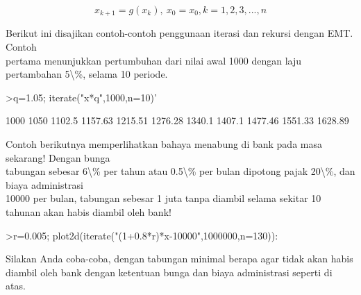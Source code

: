 \documentclass{article}
\begin{document}
\begin{eulernotebook}
\begin{eulercomment}
\begin{eulercomment}
\begin{eulercomment}
\begin{eulercomment}
\begin{eulercomment}
\begin{eulercomment}
\begin{eulercomment}
\begin{eulercomment}
\begin{eulercomment}
\begin{eulercomment}
\begin{eulercomment}
\begin{eulercomment}
\begin{eulercomment}
\begin{eulercomment}
\begin{eulercomment}
\begin{eulercomment}
\begin{eulercomment}
\begin{eulercomment}
\begin{eulercomment}
\begin{eulercomment}
\begin{eulercomment}
\begin{eulercomment}
\begin{eulercomment}
\begin{eulercomment}
\begin{eulercomment}
\begin{eulercomment}
\begin{eulercomment}
\begin{eulercomment}
\begin{eulercomment}
\end{eulercomment}
\begin{eulerformula}
\[
x_{k+1}=g(x_k), \ x_0=x_0, k= 1, 2, 3, ..., n
\]
\end{eulerformula}
\begin{eulercomment}
Berikut ini disajikan contoh-contoh penggunaan iterasi dan rekursi
dengan EMT. Contoh\\
pertama menunjukkan pertumbuhan dari nilai awal 1000 dengan laju
pertambahan 5\textbackslash{}\%, selama 10 periode.
\end{eulercomment}
\begin{eulerprompt}
>q=1.05; iterate("x*q",1000,n=10)'
\end{eulerprompt}
\begin{euleroutput}
           1000 
           1050 
         1102.5 
        1157.63 
        1215.51 
        1276.28 
         1340.1 
         1407.1 
        1477.46 
        1551.33 
        1628.89 
\end{euleroutput}
\begin{eulercomment}
Contoh berikutnya memperlihatkan bahaya menabung di bank pada masa
sekarang! Dengan bunga\\
tabungan sebesar 6\textbackslash{}\% per tahun atau 0.5\textbackslash{}\% per bulan dipotong pajak
20\textbackslash{}\%, dan biaya administrasi\\
10000 per bulan, tabungan sebesar 1 juta tanpa diambil selama sekitar
10 tahunan akan habis diambil oleh bank!
\end{eulercomment}
\begin{eulerprompt}
>r=0.005; plot2d(iterate("(1+0.8*r)*x-10000",1000000,n=130)):
\end{eulerprompt}
\begin{eulercomment}
Silakan Anda coba-coba, dengan tabungan minimal berapa agar tidak akan
habis diambil oleh bank dengan ketentuan bunga dan biaya administrasi
seperti di atas.


\end{eulercomment}
\end{eulercomment}
\end{eulercomment}
\end{eulercomment}
\end{eulercomment}
\end{eulercomment}
\end{eulercomment}
\end{eulercomment}
\end{eulercomment}
\end{eulercomment}
\end{eulercomment}
\end{eulercomment}
\end{eulercomment}
\end{eulercomment}
\end{eulercomment}
\end{eulercomment}
\end{eulercomment}
\end{eulercomment}
\end{eulercomment}
\end{eulercomment}
\end{eulercomment}
\end{eulercomment}
\end{eulercomment}
\end{eulercomment}
\end{eulercomment}
\end{eulercomment}
\end{eulercomment}
\end{eulercomment}
\end{eulercomment}
\end{eulernotebook}
\end{document}
